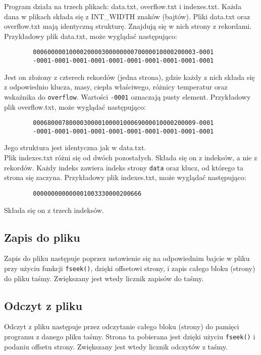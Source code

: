 \documentclass{article}
\begin{document}
    Program działa na trzech plikach: data.txt, overflow.txt i indexes.txt. 
    Każda dana w plikach składa się z INT\_WIDTH znaków (bajtów).
    Pliki data.txt oraz overflow.txt mają identyczną strukturę. Znajdują się w nich strony z rekordami.
    Przykładowy plik data.txt, może wyglądać następująco:
    \begin{lstlisting}
        000600000100002000030000000070000010000200003-0001
        -0001-0001-0001-0001-0001-0001-0001-0001-0001-0001
    \end{lstlisting}
    \noindent Jest on złożony z czterech rekordów (jedna strona), gdzie każdy z nich składa się z odpowiednio klucza, masy, ciepła właściwego, różnicy temperatur oraz wskaźnika do \texttt{overflow}.
    Wartości \texttt{-0001} oznaczają pusty element.
    Przykładowy plik overflow.txt, może wyglądać następująco:
    \begin{lstlisting} 
        000680007800003000010000100069000010000200009-0001
        -0001-0001-0001-0001-0001-0001-0001-0001-0001-0001
    \end{lstlisting}
    Jego struktura jest identyczna jak w data.txt. \\
    Plik indexes.txt różni się od dwóch pozostałych. Składa się on z indeksów, a nie z rekordów.
    Każdy indeks zawiera indeks strony \texttt{data} oraz klucz, od którego ta strona się zaczyna.
    Przykładowy plik indexes.txt, może wyglądać następująco:
    \begin{lstlisting}
        000000000000001003330000200666
    \end{lstlisting}
    Składa się on z trzech indeksów.
    
    \subsection*{Zapis do pliku}

    Zapis do pliku następuje poprzez ustawienie się na odpowiednim bajcie w pliku przy użyciu funkcji \texttt{fseek()}, dzięki offsetowi strony, i zapis całego bloku (strony) do pliku taśmy.
    Zwiększany jest wtedy licznik zapisów do taśmy.

    \subsection*{Odczyt z pliku}

    Odczyt z pliku następuje przez odczytanie całego bloku (strony) do pamięci programu z danego pliku taśmy. Strona ta pobierana jest dzięki użyciu \texttt{fseek()} i podaniu offsetu strony.
    Zwiększany jest wtedy licznik odczytów z taśmy.
\end{document}
